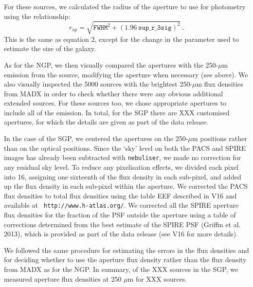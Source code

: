 \documentclass[useAMS,usenatbib]{mn2e}
\begin{document}
For these sources, we calculated the radius of the aperture
to use for photometry using the relationship:
\smallskip
\begin{equation} 
r_\mathrm{ap} = \sqrt{ \mathtt{FWHM}^2 + {(1.96
    \ \mathtt{sup\_r\_3sig})}^2}\ .
\end{equation}
\smallskip
\noindent This is the same as equation 2, except for the change
in the parameter used to estimate the size of the galaxy.

As for the NGP, we then visually compared the apertures
with the 250-$\mu$m emission from the source, modifying the aperture
when necessary (see above). 
We also visually inspected the 5000 sources with the brightest
250-$\mu$m flux densities from MADX in order to check whether
there were any obvious additional extended sources. 
For these sources too, we chose appropriate apertures
to include all of the emission.
In total, for the SGP there are XXX customised apertures, for which the
details are given as part
of the
data release.

In the case of the SGP, 
we centered the apertures on the
250-$\mu$m positions rather than on the optical positions.
Since the `sky' level on both the PACS and SPIRE images
 has already been subtracted
with {\tt nebuliser}, we made no correction for any
residual sky level.
To reduce any pixelisation
effects, we divided each pixel into 16, assigning
one sixteenth of the flux density in each sub-pixel, and
added up the flux density in each sub-pixel within the
aperture.
We corrected the PACS flux densities to
total flux densities using the
table EEF
described in V16 and available at {\tt
http://www.h-atlas.org/}.
We corrected all the 
SPIRE aperture flux densities for the fraction of the PSF outside the aperture
using a table of 
corrections determined from the best estimate of the SPIRE PSF (Griffin et al. 2013),
which is provided as part of the data release (see V16 for more details).

We followed the same procedure for estimating the errors in the
flux densities and for deciding whether to use the aperture flux
density rather than the flux density from MADX as for the NGP.
In summary, of the XXX sources in the SGP, we measured aperture
flux densities at 250 $\mu$m for XXX sources. 
\end{document}
